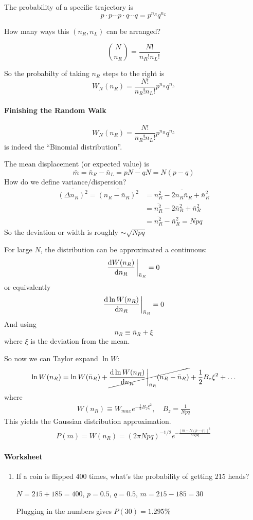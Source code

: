 \documentclass[../main.tex]{subfiles}
\begin{document}
The probability of a specific trajectory is
\[p\cdot p \cdots p \cdot q\cdots q = p^{n_R} q^{n_L}\]

How many ways this $(n_R, n_L)$ can be arranged?

\[\binom{N}{n_R} = \frac{N!}{n_R! n_L!}\]

So the probabilty of taking $n_R$ steps to the right is
\[W_N (n_R) = \frac{N!}{n_R! n_L!} p^{n_R} q^{n_L} \]

\newpage
{}
\paragraph*{Finishing the Random Walk}
\[W_N (n_R) = \frac{N!}{n_R! n_L!} p^{n_R} q^{n_L} \]
is indeed the ``Binomial distribution''.

The mean displacement (or expected value) is
\[\bar m = \bar n_R -\bar n_L = pN - qN = N(p - q)\]
How do we define variance/dispersion?
\begin{align*}
    \overline{(\Delta n_R)^2} = \overline{(n_R - \bar n_R)^2} &= \overline{n_R^2 - 2n_R \bar n_R + \bar n_R^2} \\
    &= \overline{n_R^2} - 2\bar n_R^2 + \bar n_R^2 \\
    &= \overline{n_R^2} - \bar n_R^2 = Npq
\end{align*}
So the deviation or width is roughly $\sim \sqrt{Npq}$

For large $N$, the distribution can be approximated a continuous:
\[\dv{W(n_R)}{n_R}\eval_{\bar n_R} = 0\]
or equivalently
\[\dv{\ln W(n_R)}{n_R}\eval_{\bar n_R} = 0\]
And using 
\[n_R \equiv \bar n_R + \xi\]
where $\xi$ is the deviation from the mean.

So now we can Taylor expand $\ln W$:
\begin{align*}
    \ln W(n_R) = \ln W(\bar n_R) + \cancel{\dv{\ln W(n_R)}{n_R}\eval_{\bar n_R} (n_R - \bar n_R)} + \frac{1}{2} B_z \xi^2 + \dots
\end{align*}
where
\begin{align*}
    W(n_R) \equiv W_{max} e^{-\frac{1}{2} B_z \xi^2}, \quad B_z = \frac{1}{Npq}
\end{align*}
This yields the Gaussian distribution approximation.
\begin{align*}
    P(m) = W(n_R) = (2\pi Npq)^{-1/2} e^{-\frac{[m - N(p-q)]^2}{8Npq}}
\end{align*}

\paragraph*{Worksheet}
\begin{enumerate}
    \item If a coin is flipped 400 times, what's the probability of getting 215 heads?
    
    $N = 215 + 185 = 400$, $p = 0.5$, $q = 0.5$, $m = 215 - 185 = 30$

    Plugging in the numbers gives $P(30) = 1.295\%$
\end{enumerate}
\end{document}
